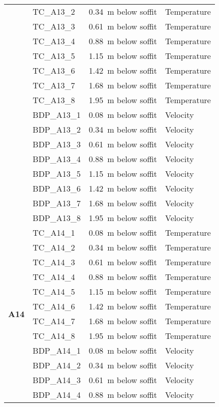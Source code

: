\begin{longtable}[c]{c|lll}
 & TC\_A13\_2  & 0.34~m below soffit  & Temperature \\
 & TC\_A13\_3  & 0.61~m below soffit  & Temperature \\
 & TC\_A13\_4  & 0.88~m below soffit  & Temperature \\
 & TC\_A13\_5  & 1.15~m below soffit  & Temperature \\
 & TC\_A13\_6  & 1.42~m below soffit  & Temperature \\
 & TC\_A13\_7  & 1.68~m below soffit  & Temperature \\
 & TC\_A13\_8  & 1.95~m below soffit  & Temperature \\
\cline{2-4}
 & BDP\_A13\_1 & 0.08~m below soffit  & Velocity \\
 & BDP\_A13\_2 & 0.34~m below soffit  & Velocity \\
 & BDP\_A13\_3 & 0.61~m below soffit  & Velocity \\
 & BDP\_A13\_4 & 0.88~m below soffit  & Velocity \\
 & BDP\_A13\_5 & 1.15~m below soffit  & Velocity \\
 & BDP\_A13\_6 & 1.42~m below soffit  & Velocity \\
 & BDP\_A13\_7 & 1.68~m below soffit  & Velocity \\
 & BDP\_A13\_8 & 1.95~m below soffit  & Velocity \\
\midrule
\multirow{16}{*}{\large{\textbf{A14}}}
 & TC\_A14\_1  & 0.08~m below soffit  & Temperature \\
 & TC\_A14\_2  & 0.34~m below soffit  & Temperature \\
 & TC\_A14\_3  & 0.61~m below soffit  & Temperature \\
 & TC\_A14\_4  & 0.88~m below soffit  & Temperature \\
 & TC\_A14\_5  & 1.15~m below soffit  & Temperature \\
 & TC\_A14\_6  & 1.42~m below soffit  & Temperature \\
 & TC\_A14\_7  & 1.68~m below soffit  & Temperature \\
 & TC\_A14\_8  & 1.95~m below soffit  & Temperature \\
\cline{2-4}
 & BDP\_A14\_1 & 0.08~m below soffit  & Velocity \\
 & BDP\_A14\_2 & 0.34~m below soffit  & Velocity \\
 & BDP\_A14\_3 & 0.61~m below soffit  & Velocity \\
 & BDP\_A14\_4 & 0.88~m below soffit  & Velocity \\

\end{longtable}
